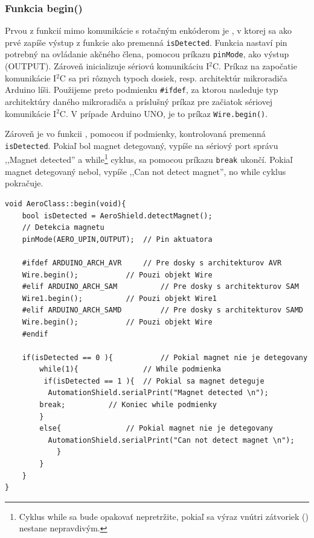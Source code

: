 \subsubsection{Funkcia begin()}

Prvou z funkcií mimo komunikácie s rotačným enkóderom je , v ktorej sa ako prvé zapíše výstup z funkcie  ako premenná \verb|isDetected|. Funkcia  nastaví pin potrebný na ovládanie akčného člena, pomocou príkazu \verb|pinMode|, ako výstup (OUTPUT). Zároveň inicializuje sériovú komunikáciu I$^{2}$C. Príkaz na započatie komunikácie I$^{2}$C sa pri rôznych typoch dosiek, resp. architektúr mikroradiča Arduino líši. Použijeme preto podmienku \verb|#ifdef|, za ktorou nasleduje typ architektúry daného mikroradiča a príslušný príkaz pre začiatok sériovej komunikácie I$^{2}$C. V prípade Arduino UNO, je to príkaz \verb|Wire.begin()|. 

Zároveň je vo funkcii , pomocou if podmienky, kontrolovaná premenná \verb|isDetected|. Pokiaľ bol magnet detegovaný, vypíše na sériový port správu ,,Magnet detected'' a while\footnote[7]{Cyklus while sa bude opakovať nepretržite, pokiaľ sa výraz vnútri zátvoriek () nestane nepravdivým.} cyklus, sa pomocou príkazu \verb|break| ukončí. Pokiaľ magnet detegovaný nebol, vypíše ,,Can not detect magnet'', no while cyklus pokračuje.  


\begin{lstlisting}[caption={Zdrojový kód funkcie begin.},captionpos=b]
void AeroClass::begin(void){                       
	bool isDetected = AeroShield.detectMagnet(); 
	// Detekcia magnetu 
	pinMode(AERO_UPIN,OUTPUT);	// Pin aktuatora
	
	#ifdef ARDUINO_ARCH_AVR		// Pre dosky s architekturov AVR
	Wire.begin();			// Pouzi objekt Wire
	#elif ARDUINO_ARCH_SAM      	// Pre dosky s architekturov SAM
	Wire1.begin();			// Pouzi objekt Wire1
	#elif ARDUINO_ARCH_SAMD     	// Pre dosky s architekturov SAMD
	Wire.begin();			// Pouzi objekt Wire
	#endif
	
	if(isDetected == 0 ){       	// Pokial magnet nie je detegovany
		while(1){               // While podmienka
		 if(isDetected == 1 ){	// Pokial sa magnet deteguje
		  AutomationShield.serialPrint("Magnet detected \n");	
		break;		    // Koniec while podmienky
		}
		else{               // Pokial magnet nie je detegovany
		  AutomationShield.serialPrint("Can not detect magnet \n");
			}
		}
	}       
} 
\end{lstlisting}


